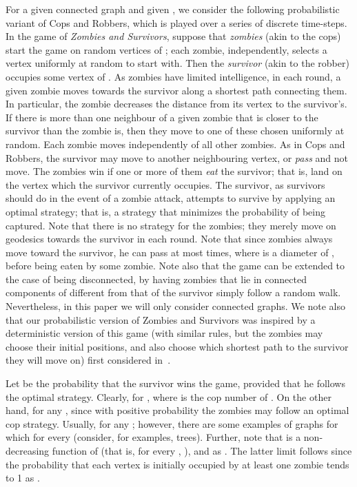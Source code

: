 \documentclass[12pt]{amsart}
\begin{document}
For a given connected graph  and given , we consider the following probabilistic variant of Cops and Robbers, which is played over a series of discrete time-steps. In the game of \emph{Zombies and
Survivors}, suppose that  \emph{zombies} (akin to the cops) start the game on random vertices of ; each zombie, independently, selects a vertex uniformly at
random to start with. Then the \emph{survivor} (akin to the robber) occupies some vertex of . As zombies have limited intelligence, in each round, a given zombie moves towards the survivor along a
shortest path connecting them. In particular, the zombie decreases the distance from its vertex to the survivor's. If there is more than one neighbour of a given zombie that is closer to the survivor
than the zombie is, then they move to one of these chosen uniformly at random. Each zombie moves independently of all other zombies. As in Cops and Robbers, the survivor may move to another
neighbouring vertex, or \emph{pass} and not move. The zombies win if one or more of them \emph{eat} the survivor; that is, land on the vertex which the survivor currently occupies. The survivor, as survivors should do in the event of a zombie attack, attempts to survive by applying an optimal strategy; that is, a strategy that minimizes the probability of being captured. Note that there is no strategy for the zombies; they merely move on
geodesics towards the survivor in each round. Note that since zombies always move toward the survivor, he can pass at most  times, where  is a diameter of , before being eaten by some zombie.
Note also that the game can be extended to the case of  being disconnected, by having zombies that lie in connected components of  different from that of the survivor simply follow a random walk. Nevertheless, in this paper we will only consider connected graphs. We note also that our probabilistic version of Zombies and Survivors was inspired by a deterministic version of this game (with similar rules, but the zombies may choose their initial positions, and also choose which shortest path to the survivor they will move on) first considered in~\cite{hm}.

\bigskip

Let  be the probability that the survivor wins the game, provided that he follows the optimal strategy. Clearly,  for , where  is the cop number of .
On the other hand,  for any , since with positive probability the zombies may follow an optimal cop strategy. Usually,  for any ; however, there are some examples of graphs for which  for every  (consider, for examples, trees).
Further, note that  is a non-decreasing function of  (that is, for every , ), and  as . The latter limit follows since the probability that each vertex is initially occupied by at least one zombie tends to 1 as .
\end{document}
